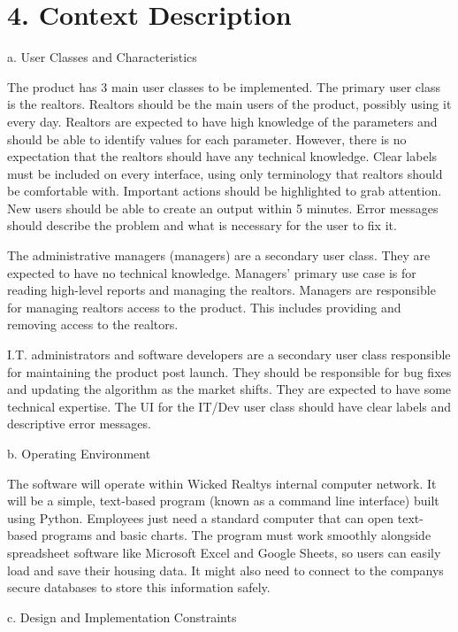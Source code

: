 \documentclass[
]{article}
\begin{document}
 {}\section{4. Context Description}\label{context-description}

a. User Classes and Characteristics

The product has 3 main user classes to be implemented. The primary user
class is the realtors. Realtors should be the main users of the product,
possibly using it every day. Realtors are expected to have high
knowledge of the parameters and should be able to identify values for
each parameter. However, there is no expectation that the realtors
should have any technical knowledge. Clear labels must be included on
every interface, using only terminology that realtors should be
comfortable with. Important actions should be highlighted to grab
attention. New users should be able to create an output within 5
minutes. Error messages should describe the problem and what is
necessary for the user to fix it.

The administrative managers (managers) are a secondary user class. They
are expected to have no technical knowledge. Managers' primary use case
is for reading high-level reports and managing the realtors. Managers
are responsible for managing realtors\textquotesingle{} access to the
product. This includes providing and removing access to the realtors.

I.T. administrators and software developers are a secondary user class
responsible for maintaining the product post launch. They should be
responsible for bug fixes and updating the algorithm as the market
shifts. They are expected to have some technical expertise. The UI for
the IT/Dev user class should have clear labels and descriptive error
messages.

b. Operating Environment

The software will operate within Wicked Realty\textquotesingle s
internal computer network. It will be a simple, text-based program
(known as a command line interface) built using Python. Employees just
need a standard computer that can open text-based programs and basic
charts. The program must work smoothly alongside spreadsheet software
like Microsoft Excel and Google Sheets, so users can easily load and
save their housing data. It might also need to connect to the
company\textquotesingle s secure databases to store this information
safely.

c. Design and Implementation Constraints
\end{document}
